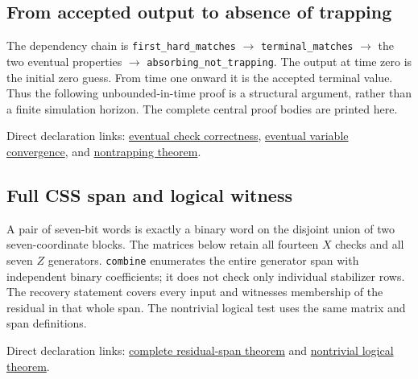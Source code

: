 \subsection{From accepted output to absence of trapping}
The dependency chain is
\texttt{first\_hard\_matches} $\to$ \texttt{terminal\_matches} $\to$
the two eventual properties $\to$ \texttt{absorbing\_not\_trapping}.
The output at time zero is the initial zero guess. From time one onward
it is the accepted terminal value. Thus the following unbounded-in-time
proof is a structural argument, rather than a finite simulation horizon.
The complete central proof bodies are printed here.

Direct declaration links:
\href{https://github.com/alectionary/vibe-math/blob/2717b0ab2b59c2ccb71f0e369a9f21d80490c191/formalization/gallager-b-absorbing/Counterexample.lean#L101}{eventual check correctness},
\href{https://github.com/alectionary/vibe-math/blob/2717b0ab2b59c2ccb71f0e369a9f21d80490c191/formalization/gallager-b-absorbing/Counterexample.lean#L108}{eventual variable convergence}, and
\href{https://github.com/alectionary/vibe-math/blob/2717b0ab2b59c2ccb71f0e369a9f21d80490c191/formalization/gallager-b-absorbing/Counterexample.lean#L115}{nontrapping theorem}.

\subsection{Full CSS span and logical witness}
A pair of seven-bit words is exactly a binary word on the disjoint union
of two seven-coordinate blocks. The matrices below retain all fourteen
$X$ checks and all seven $Z$ generators. \texttt{combine} enumerates the
entire generator span with independent binary coefficients; it does not
check only individual stabilizer rows. The recovery statement covers every
input and witnesses membership of the residual in that whole span.
The nontrivial logical test uses the same matrix and span definitions.

Direct declaration links:
\href{https://github.com/alectionary/vibe-math/blob/2717b0ab2b59c2ccb71f0e369a9f21d80490c191/formalization/gallager-b-absorbing/Counterexample.lean#L151}{complete residual-span theorem} and
\href{https://github.com/alectionary/vibe-math/blob/2717b0ab2b59c2ccb71f0e369a9f21d80490c191/formalization/gallager-b-absorbing/Counterexample.lean#L165}{nontrivial logical theorem}.

